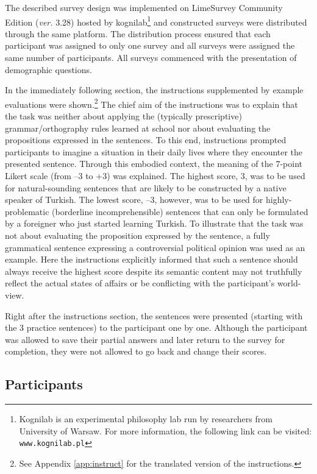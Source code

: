 The described survey design was implemented on LimeSurvey Community Edition (\textit{ver.} 3.28) hosted by kognilab\footnote{Kognilab is an experimental philosophy lab run by researchers from University of Warsaw. For more information, the following link can be visited: \texttt{www.kognilab.pl}} and constructed surveys were distributed through the same platform. The distribution process ensured that each participant was assigned to only one survey and all surveys were assigned the same number of participants. All surveys commenced with the presentation of demographic questions. 

In the immediately following section, the instructions supplemented by example evaluations were shown.\footnote{See Appendix \ref{app:instruct} for the translated version of the instructions.} The chief aim of the instructions was to explain that the task was neither about applying the (typically prescriptive) grammar/orthography rules learned at school nor about evaluating the propositions expressed in the sentences. To this end, instructions prompted participants to imagine a situation in their daily lives where they encounter the presented sentence. Through this embodied context, the meaning of the 7-point Likert scale (from --3 to $+$3) was explained. The highest score, 3, was to be used for natural-sounding sentences that are likely to be constructed by a native speaker of Turkish. The lowest score, --3, however, was to be used for highly-problematic (borderline incomprehensible) sentences that can only be formulated by a foreigner who just started learning Turkish. To illustrate that the task was not about evaluating the proposition expressed by the sentence, a fully grammatical sentence expressing a controversial political opinion was used as an example. Here the instructions explicitly informed that such a sentence should always receive the highest score despite its semantic content may not truthfully reflect the actual states of affairs or be conflicting with the participant's world-view. 

Right after the instructions section, the sentences were presented (starting with the 3 practice sentences) to the participant one by one. Although the participant was allowed to save their partial answers and later return to the survey for completion, they were not allowed to go back and change their scores.


\subsection{Participants}

